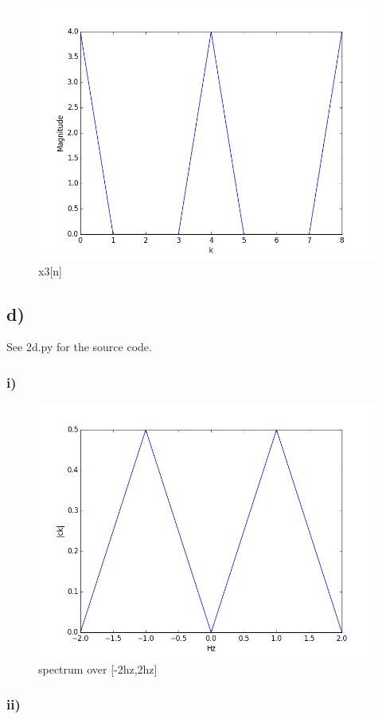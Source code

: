 \begin{figure}[H]
  \centering
  \includegraphics[width=\linewidth]{2b_3}
  \caption{x3[n]}
  \label{fig:2b3}
\end{figure}

\subsection*{d)}
See 2d.py for the source code.

\subsubsection*{i)}
\begin{figure}[H]
\includegraphics[width=\textwidth]{2dii}
\caption{spectrum over [-2hz,2hz]}
\label{fig:2dii}
\end{figure}

\subsubsection*{ii)}

